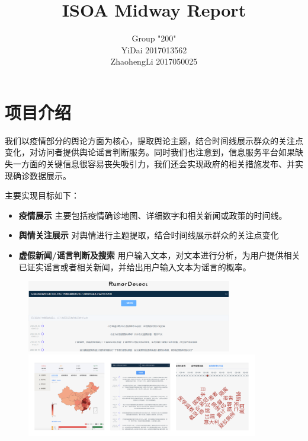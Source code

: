 \documentclass{article}
\title{ISOA Midway Report}
\author{Group "200"\\YiDai 2017013562\\ZhaohengLi 2017050025}
\begin{document}
\maketitle

\section{项目介绍}
我们以疫情部分的舆论方面为核心，提取舆论主题，结合时间线展示群众的关注点变化，对访问者提供舆论谣言判断服务。同时我们也注意到，信息服务平台如果缺失一方面的关键信息很容易丧失吸引力，我们还会实现政府的相关措施发布、并实现确诊数据展示。

主要实现目标如下：
\begin{itemize}
	\item{\textbf{疫情展示}} 主要包括疫情确诊地图、详细数字和相关新闻或政策的时间线。
	\item{\textbf{舆情关注展示}} 对舆情进行主题提取，结合时间线展示群众的关注点变化
	\item{\textbf{虚假新闻/谣言判断及搜索}} 用户输入文本，对文本进行分析，为用户提供相关已证实谣言或者相关新闻，并给出用户输入文本为谣言的概率。
\end{itemize}

\begin{figure}[H]
\centering
\includegraphics[width=0.8\textwidth]{pic0.png}
\includegraphics[width=0.9\textwidth]{pic1.png}
\end{figure}
\end{document}
